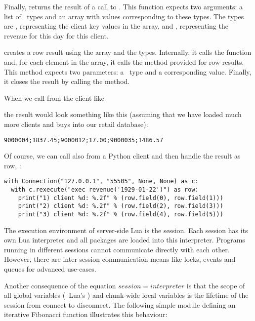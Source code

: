 Finally,  returns the result
of a call to .
This function expects two arguments:
a list of \nowdb\ types and an array with
values corresponding to these types.
The types are , representing the
client key values in the  array,
and , representing the revenue
for this day for this client.

 creates a row result
using the array and the types. Internally,
it calls the  function
and, for each element in the array, it calls
the method  provided for row results.
This method expects two parameters:
a \nowdb\ type and a corresponding value.
Finally, it closes the result by calling
the  method.

When we call  from the client like


the result would look something like this
(assuming that we have loaded much more
clients and buys into our retail database):
\begin{verbatim}
9000004;1837.45;9000012;17.00;9000035;1486.57
\end{verbatim}

\begin{minipage}{\textwidth}
Of course, we can call 
also from a Python client and then handle
the result as row, \eg:

\begin{python}
\begin{lstlisting}
with Connection("127.0.0.1", "55505", None, None) as c:
  with c.rexecute("exec revenue('1929-01-22')") as row:
    print("1) client %d: %.2f" % (row.field(0), row.field(1)))
    print("2) client %d: %.2f" % (row.field(2), row.field(3)))
    print("3) client %d: %.2f" % (row.field(4), row.field(5)))
\end{lstlisting}
\end{python}
\end{minipage}

The execution environment of server-side Lua
is the session. Each session has its own
Lua interpreter and all packages are loaded
into this interpreter. Programs running
in different sessions cannot communicate
directly with each other.
However, there are inter-session
communication means like locks, events and
queues for advanced use-cases.

Another consequence of the equation
$session = interpreter$ is that the scope
of all global variables (\ie\ Lua's )
and chunk-wide local
variables is the lifetime of the session
from connect to disconnect.
The following simple module defining an iterative
Fibonacci function illustrates this behaviour:

